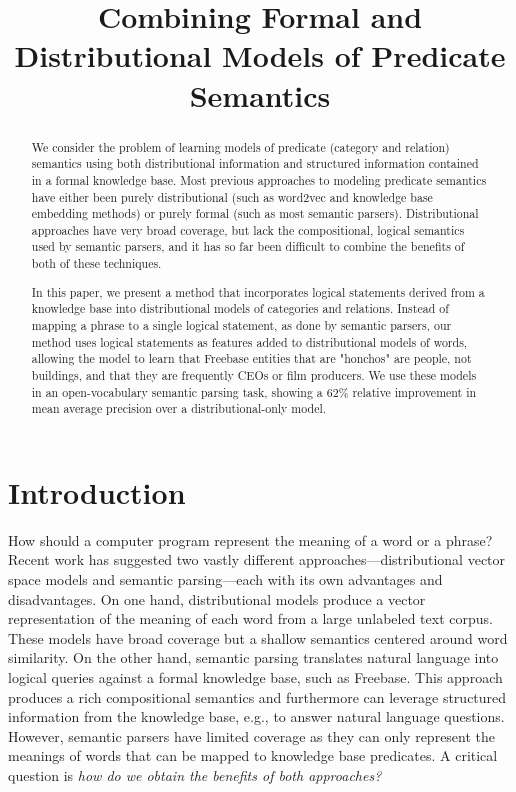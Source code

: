 \documentclass[11pt]{article}
\title{Combining Formal and Distributional Models of Predicate Semantics}
\author{}%
\date{}
\begin{document}
\maketitle

\begin{abstract}

  We consider the problem of learning models of predicate (category and
  relation) semantics using both distributional information and structured
  information contained in a formal knowledge base.  Most previous approaches
  to modeling predicate semantics have either been purely distributional (such
  as word2vec and knowledge base embedding methods) or purely formal (such as
  most semantic parsers).  Distributional approaches have very broad coverage,
  but lack the compositional, logical semantics used by semantic parsers, and
  it has so far been difficult to combine the benefits of both of these
  techniques.

  In this paper, we present a method that incorporates logical statements
  derived from a knowledge base into distributional models of categories and
  relations.  Instead of mapping a phrase to a single logical statement, as
  done by semantic parsers, our method uses logical statements as features
  added to distributional models of words, allowing the model to learn that
  Freebase entities that are "honchos" are people, not buildings, and that they
  are frequently CEOs or film producers.  We use these models in an
  open-vocabulary semantic parsing task, showing a 62\% relative improvement in
  mean average precision over a distributional-only model.

\end{abstract}

\section{Introduction}

How should a computer program represent the meaning of a word or a
phrase? Recent work has suggested two vastly different
approaches---distributional vector space models and semantic
parsing---each with its own advantages and disadvantages. On one hand,
distributional models produce a vector representation of the meaning
of each word from a large unlabeled text corpus. These models have
broad coverage but a shallow semantics centered around word
similarity. On the other hand, semantic parsing translates natural
language into logical queries against a formal knowledge base, such as
Freebase. This approach produces a rich compositional semantics and
furthermore can leverage structured information from the knowledge
base, e.g., to answer natural language questions. However, semantic
parsers have limited coverage as they can only represent the meanings
of words that can be mapped to knowledge base predicates. A critical
question is \emph{how do we obtain the benefits of both approaches?}
\end{document}
